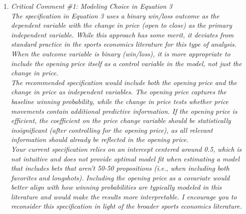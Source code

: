 \documentclass[letterpaper,12pt]{article}
\newcounter{b}
\begin{document}
\begin{enumerate}


\item \textit{Critical Comment \#1: Modeling Choice in Equation 3\\[6pt]
The specification in Equation 3 uses a binary win/loss outcome as the dependent variable with the change in price (open to close) as the primary independent variable. While this approach has some merit, it deviates from standard practice in the sports economics literature for this type of analysis. When the outcome variable is binary (win/loss), it is more appropriate to include the opening price itself as a control variable in the model, not just the change in price.\\[6pt]
The recommended specification would include both the opening price and the change in price as independent variables. The opening price captures the baseline winning probability, while the change in price tests whether price movements contain additional predictive information. If the opening price is efficient, the coefficient on the price change variable should be statistically insignificant (after controlling for the opening price), as all relevant information should already be reflected in the opening price.\\[6pt]
Your current specification relies on an intercept centered around 0.5, which is not intuitive and does not provide optimal model fit when estimating a model that includes bets that aren't 50-50 propositions (i.e., when including both favorites and longshots). Including the opening price as a covariate would better align with how winning probabilities are typically modeled in this literature and would make the results more interpretable. I encourage you to reconsider this specification in light of the broader sports economics literature.}




\end{enumerate}
\end{document}
